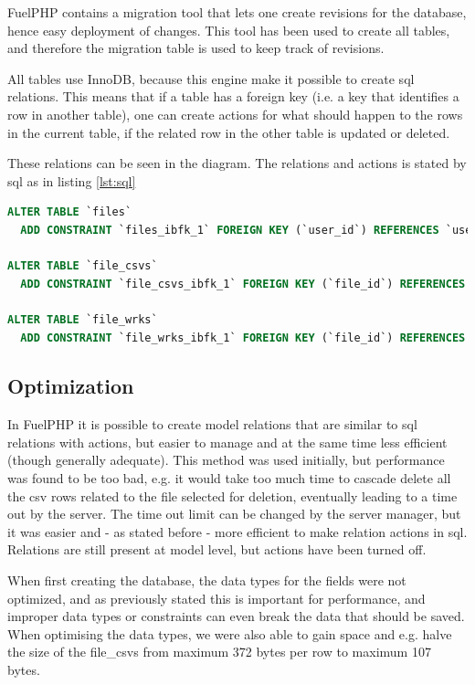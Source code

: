 FuelPHP contains a \textsf{migration} tool that lets one create revisions for the database, hence easy deployment of changes. This tool has been used to create all tables, and therefore the \textsf{migration} table is used to keep track of revisions.

All tables use \textsf{InnoDB}, because this engine make it possible to create sql relations. This means that if a table has a foreign key (i.e. a key that identifies a row in another table), one can create actions for what should happen to the rows in the current table, if the related row in the other table is \textsf{updated} or \textsf{deleted}.

These relations can be seen in the diagram. The relations and actions is stated by sql as in listing \ref{lst:sql}
\begin{lstlisting}[language=sql,caption={SQL realations and actions},label={lst:sql}]
ALTER TABLE `files`
  ADD CONSTRAINT `files_ibfk_1` FOREIGN KEY (`user_id`) REFERENCES `users` (`id`) ON DELETE NO ACTION ON UPDATE NO ACTION;

ALTER TABLE `file_csvs`
  ADD CONSTRAINT `file_csvs_ibfk_1` FOREIGN KEY (`file_id`) REFERENCES `files` (`id`) ON DELETE CASCADE ON UPDATE NO ACTION;

ALTER TABLE `file_wrks`
  ADD CONSTRAINT `file_wrks_ibfk_1` FOREIGN KEY (`file_id`) REFERENCES `files` (`id`) ON DELETE CASCADE ON UPDATE NO ACTION;
\end{lstlisting}

\subsection{Optimization}
\label{sec:database_optimization}
In FuelPHP it is possible to create model relations that are similar to sql relations with actions, but easier to manage and at the same time less efficient (though generally adequate). This method was used initially, but performance was found to be too bad, e.g. it would take too much time to cascade delete all the csv rows related to the file selected for deletion, eventually leading to a time out by the server. The time out limit can be changed by the server manager, but it was easier and - as stated before - more efficient to make relation actions in sql. Relations are still present at model level, but actions have been turned off.

When first creating the database, the data types for the fields were not optimized, and as previously stated this is important for performance, and improper data types or constraints can even break the data that should be saved. When optimising the data types, we were also able to gain space and e.g. halve the size of the \textsf{file\_csvs} from maximum 372 bytes per row to maximum 107 bytes.

